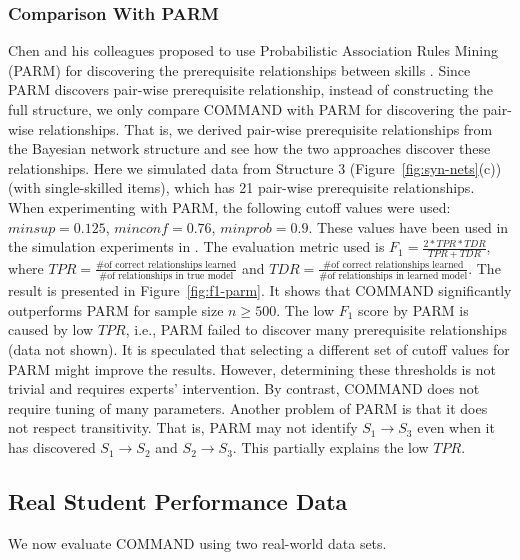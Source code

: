 \documentclass{edm_template}
\begin{document}
	\subsubsection{Comparison With PARM}
	Chen and his colleagues proposed to use Probabilistic Association Rules Mining (PARM) for discovering the prerequisite relationships between skills \cite{chen2015discovering}.
	Since PARM discovers pair-wise prerequisite relationship, instead of constructing the full structure,
	we only compare COMMAND with PARM for discovering the pair-wise relationships.
	That is, we derived pair-wise prerequisite relationships from the Bayesian network structure and see how the two approaches discover these relationships.
	Here we simulated data from Structure 3 (Figure~\ref{fig:syn-nets}(c)) (with single-skilled items), which has 21 pair-wise prerequisite relationships.
	When experimenting with PARM, the following cutoff values were used: $ minsup=0.125$, $minconf=0.76$, $minprob=0.9$. 
	These values have been used in the simulation experiments in \cite{chen2015discovering}.
	The evaluation metric used is $F_1=\frac{2*TPR*TDR}{TPR+TDR}$, where $TPR=\frac{\text{\# of correct relationships learned}}{\text{\# of relationships in true model}}$
	and $TDR=\frac{\text{\# of correct relationships learned}}{\text{\# of relationships in learned model}}$.
	The result is presented in Figure~\ref{fig:f1-parm}. It shows that COMMAND significantly outperforms PARM for sample size $n\ge 500$.
	The low $F_1$ score by PARM is caused by low $TPR$, i.e., PARM failed to discover many prerequisite relationships (data not shown).
	It is speculated that selecting a different set of cutoff values for PARM might improve the results.
	However, determining these thresholds is not trivial and requires experts' intervention. By contrast, COMMAND does not require tuning of many parameters.  
	Another problem of PARM is that it does not respect transitivity. 
	That is, PARM may not identify $S_1\rightarrow S_3$ even when it has discovered $S_1\rightarrow S_2$ and $S_2\rightarrow S_3$.
	This partially explains the low $TPR$.	 
	
	\subsection{Real Student Performance Data}
	\label{sec:real}
	We now evaluate COMMAND using two real-world data sets.
	
\end{document}
